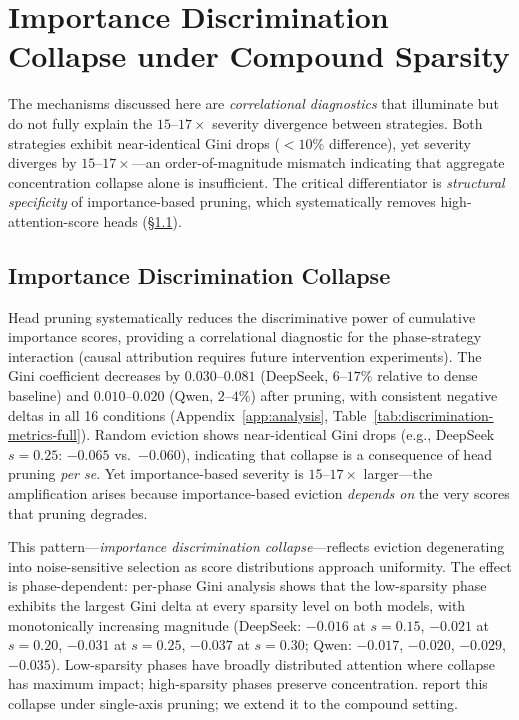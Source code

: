 \section{Importance Discrimination Collapse under Compound Sparsity}
\label{sec:analysis}

The mechanisms discussed here are \emph{correlational diagnostics} that illuminate but do not fully explain the $15$--$17{\times}$ severity divergence between strategies. Both strategies exhibit near-identical Gini drops ($<10\%$ difference), yet severity diverges by $15$--$17{\times}$---an order-of-magnitude mismatch indicating that aggregate concentration collapse alone is insufficient. The critical differentiator is \emph{structural specificity} of importance-based pruning, which systematically removes high-attention-score heads (\S\ref{sec:discrimination-collapse-main}).

\subsection{Importance Discrimination Collapse}
\label{sec:discrimination-collapse-main}

Head pruning systematically reduces the discriminative power of cumulative importance scores, providing a correlational diagnostic for the phase-strategy interaction (causal attribution requires future intervention experiments). The Gini coefficient decreases by $0.030$--$0.081$ (DeepSeek, $6$--$17\%$ relative to dense baseline) and $0.010$--$0.020$ (Qwen, $2$--$4\%$) after pruning, with consistent negative deltas in all 16 conditions (Appendix~\ref{app:analysis}, Table~\ref{tab:discrimination-metrics-full}). Random eviction shows near-identical Gini drops (e.g., DeepSeek $s{=}0.25$: $-0.065$ vs.\ $-0.060$), indicating that collapse is a consequence of head pruning \emph{per se}. Yet importance-based severity is $15$--$17{\times}$ larger---the amplification arises because importance-based eviction \emph{depends on} the very scores that pruning degrades.

This pattern---\emph{importance discrimination collapse}---reflects eviction degenerating into noise-sensitive selection as score distributions approach uniformity. The effect is phase-dependent: per-phase Gini analysis shows that the low-sparsity phase exhibits the largest Gini delta at every sparsity level on both models, with monotonically increasing magnitude (DeepSeek: $-0.016$ at $s{=}0.15$, $-0.021$ at $s{=}0.20$, $-0.031$ at $s{=}0.25$, $-0.037$ at $s{=}0.30$; Qwen: $-0.017$, $-0.020$, $-0.029$, $-0.035$). Low-sparsity phases have broadly distributed attention where collapse has maximum impact; high-sparsity phases preserve concentration. \cite{hies-2025} report this collapse under single-axis pruning; we extend it to the compound setting.


